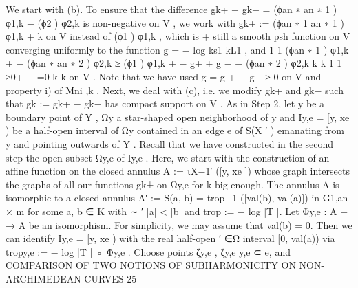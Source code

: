 \documentclass[
  10pt,
]{article}
\newenvironment{Shaded}{}{}
\newcommand{\NormalTok}[1]{#1}
\begin{document}
\begin{Shaded}
\begin{Highlighting}[]
\NormalTok{   We start with (b). To ensure that the difference gk+ − gk− = (ϕan  ∗         an ∗}
\NormalTok{                                                                   1 ) φ1,k − (ϕ2 ) φ2,k is}
\NormalTok{non{-}negative on V , we work with gk+ := (ϕan ∗       1                   an ∗}
\NormalTok{                                          1 ) φ1,k + k on V instead of (ϕ1 ) φ1,k , which is}
\NormalTok{                                                                         +}
\NormalTok{still a smooth psh function on V converging uniformly to the function g = − log ks1 kL1 ,}
\NormalTok{and}
\NormalTok{                       1                               1}
\NormalTok{          (ϕan ∗}
\NormalTok{            1 ) φ1,k +   − (ϕan  ∗         an ∗}
\NormalTok{                              2 ) φ2,k ≥ (ϕ1 ) φ1,k +    − g+ + g − − (ϕan  ∗}
\NormalTok{                                                                         2 ) φ2,k}
\NormalTok{                       k                               k}
\NormalTok{                                             1 1}
\NormalTok{                                       ≥0+ − =0}
\NormalTok{                                             k k}
\NormalTok{on V . Note that we have used g = g + − g− ≥ 0 on V and property i) of Mni ,k .}
\NormalTok{   Next, we deal with (c), i.e. we modify gk+ and gk− such that gk := gk+ − gk− has compact}
\NormalTok{support on V . As in Step 2, let y be a boundary point of Y , Ωy a star{-}shaped open}
\NormalTok{neighborhood of y and Iy,e = [y, xe ) be a half{-}open interval of Ωy contained in an edge e}
\NormalTok{of S(X ′ ) emanating from y and pointing outwards of Y . Recall that we have constructed}
\NormalTok{in the second step the open subset Ωy,e of Iy,e . Here, we start with the construction}
\NormalTok{of an affine function on the closed annulus A := τX−1′ ([y, xe ]) whose graph intersects the}
\NormalTok{graphs of all our functions gk± on Ωy,e for k big enough. The annulus A is isomorphic to}
\NormalTok{a closed annulus A′ := S(a, b) = trop−1 ([val(b), val(a)]) in G1,an                     ×}
\NormalTok{                                                                  m for some a, b ∈ K with}
\NormalTok{                                                 ∼     ′}
\NormalTok{|a| \textless{} |b| and trop := − log |T |. Let Φy,e : A − → A be an isomorphism. For simplicity, we}
\NormalTok{may assume that val(b) = 0. Then we can identify Iy,e = [y, xe ) with the real half{-}open}
\NormalTok{                                                                              ′ ∈Ω}
\NormalTok{interval [0, val(a)) via tropy,e := − log |T | ◦ Φy,e . Choose points ζy,e , ζy,e  y,e ⊂ e, and}
\NormalTok{   COMPARISON OF TWO NOTIONS OF SUBHARMONICITY ON NON{-}ARCHIMEDEAN CURVES 25}



\end{Highlighting}
\end{Shaded}
\end{document}
